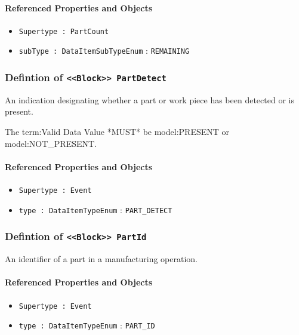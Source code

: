 \FloatBarrier
\paragraph{Referenced Properties and Objects}

\begin{itemize}
\item \texttt{Supertype : PartCount}

\item \texttt{subType : DataItemSubTypeEnum} : \texttt{REMAINING}

\end{itemize}
\FloatBarrier
\subsubsection{Defintion of \texttt{<<Block>> PartDetect}}
  \label{type:PartDetect}

\FloatBarrier

An indication designating whether a part or work piece has been detected or is present.
  
 The {term:Valid Data Value} *MUST* be {model:PRESENT} or {model:NOT_PRESENT}.

\FloatBarrier
\paragraph{Referenced Properties and Objects}

\begin{itemize}
\item \texttt{Supertype : Event}

\item \texttt{type : DataItemTypeEnum} : \texttt{PART_DETECT}

\end{itemize}
\FloatBarrier
\subsubsection{Defintion of \texttt{<<Block>> PartId}}
  \label{type:PartId}

\FloatBarrier

An identifier of a part in a manufacturing operation.

\FloatBarrier
\paragraph{Referenced Properties and Objects}

\begin{itemize}
\item \texttt{Supertype : Event}

\item \texttt{type : DataItemTypeEnum} : \texttt{PART_ID}

\end{itemize}
\FloatBarrier
